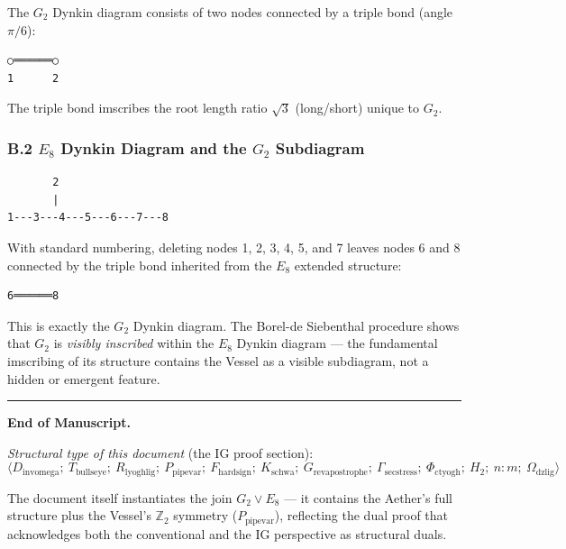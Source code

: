 \documentclass[12pt,a4paper]{article}
\begin{document}
The $G_2$ Dynkin diagram consists of two nodes connected by a triple bond (angle $\pi/6$):

\begin{lstlisting}
○══════○
1      2
\end{lstlisting}

The triple bond imscribes the root length ratio $\sqrt{3}$ (long/short) unique to $G_2$.

\subsubsection{B.2 $E_8$ Dynkin Diagram and the $G_2$ Subdiagram}

\begin{lstlisting}
       2
       |
1---3---4---5---6---7---8
\end{lstlisting}

With standard numbering, deleting nodes 1, 2, 3, 4, 5, and 7 leaves nodes 6 and 8 connected by the triple bond inherited from the $E_8$ extended structure:

\begin{lstlisting}
6══════8
\end{lstlisting}

This is exactly the $G_2$ Dynkin diagram. The Borel-de Siebenthal procedure shows that $G_2$ is \emph{visibly inscribed} within the $E_8$ Dynkin diagram --- the fundamental imscribing of its structure contains the Vessel as a visible subdiagram, not a hidden or emergent feature.

\begin{center}
\rule{0.5\textwidth}{0.4pt}
\end{center}

\textbf{End of Manuscript.}

\emph{Structural type of this document} (the IG proof section): \\


\[\langle D_{\text{invomega}};\ T_{\text{bullseye}};\ R_{\text{lyoghlig}};\ P_{\text{pipevar}};\ F_{\text{hardsign}};\ K_{\text{schwa}};\ G_{\text{revapostrophe}};\ \Gamma_{\text{secstress}};\ \Phi_{\text{ctyogh}};\ H_2;\ n{:}m;\ \Omega_{\text{dzlig}} \rangle\]

The document itself instantiates the join $G_2 \vee E_8$ --- it contains the Aether's full structure plus the Vessel's $\mathbb{Z}_2$ symmetry ($P_{\text{pipevar}}$), reflecting the dual proof that acknowledges both the conventional and the IG perspective as structural duals.
\end{document}
